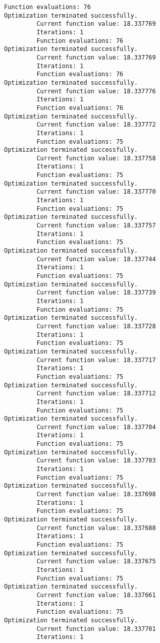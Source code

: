 \documentclass[11pt]{article}
\begin{document}
\begin{Verbatim}[commandchars=\\\{\}]
         Function evaluations: 76
Optimization terminated successfully.
         Current function value: 18.337769
         Iterations: 1
         Function evaluations: 76
Optimization terminated successfully.
         Current function value: 18.337769
         Iterations: 1
         Function evaluations: 76
Optimization terminated successfully.
         Current function value: 18.337776
         Iterations: 1
         Function evaluations: 76
Optimization terminated successfully.
         Current function value: 18.337772
         Iterations: 1
         Function evaluations: 75
Optimization terminated successfully.
         Current function value: 18.337758
         Iterations: 1
         Function evaluations: 75
Optimization terminated successfully.
         Current function value: 18.337770
         Iterations: 1
         Function evaluations: 75
Optimization terminated successfully.
         Current function value: 18.337757
         Iterations: 1
         Function evaluations: 75
Optimization terminated successfully.
         Current function value: 18.337744
         Iterations: 1
         Function evaluations: 75
Optimization terminated successfully.
         Current function value: 18.337739
         Iterations: 1
         Function evaluations: 75
Optimization terminated successfully.
         Current function value: 18.337728
         Iterations: 1
         Function evaluations: 75
Optimization terminated successfully.
         Current function value: 18.337717
         Iterations: 1
         Function evaluations: 75
Optimization terminated successfully.
         Current function value: 18.337712
         Iterations: 1
         Function evaluations: 75
Optimization terminated successfully.
         Current function value: 18.337704
         Iterations: 1
         Function evaluations: 75
Optimization terminated successfully.
         Current function value: 18.337703
         Iterations: 1
         Function evaluations: 75
Optimization terminated successfully.
         Current function value: 18.337698
         Iterations: 1
         Function evaluations: 75
Optimization terminated successfully.
         Current function value: 18.337688
         Iterations: 1
         Function evaluations: 75
Optimization terminated successfully.
         Current function value: 18.337675
         Iterations: 1
         Function evaluations: 75
Optimization terminated successfully.
         Current function value: 18.337661
         Iterations: 1
         Function evaluations: 75
Optimization terminated successfully.
         Current function value: 18.337701
         Iterations: 1

\end{Verbatim}
\end{document}

